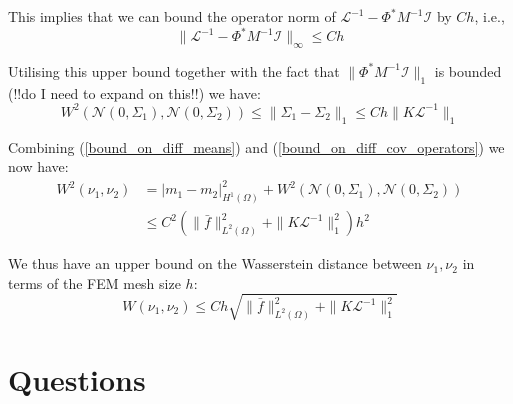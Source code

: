 \documentclass{article}
\theoremstyle{definition}
\theoremstyle{remark}
\begin{document}
This implies that we can bound the operator norm of $\mathcal{L}^{-1}-\Phi^{*}M^{-1}\mathcal{I}$ by $Ch$, i.e.,
\begin{equation}
    \label{bound_on_diff_of_solution_operators}
    \|\mathcal{L}^{-1}-\Phi^{*}M^{-1}\mathcal{I}\|_{\infty}\leq Ch
\end{equation}

Utilising this upper bound together with the fact that $\|\Phi^{*}M^{-1}\mathcal{I}\|_{1}$ is bounded (!!do I need to expand on this!!) we have:
\begin{equation}
    \label{bound_on_diff_cov_operators}
    W^{2}(\mathcal{N}(0,\Sigma_1),\mathcal{N}(0,\Sigma_2))\leq\|\Sigma_{1}-\Sigma_{2}\|_{1}\leq Ch\|K\mathcal{L}^{-1}\|_{1}
\end{equation}

Combining (\ref{bound_on_diff_means}) and (\ref{bound_on_diff_cov_operators}) we now have:
\begin{align*}
    W^{2}(\nu_{1},\nu_{2})&=|m_1-m_2|_{H^{1}(\Omega)}^{2}+W^{2}(\mathcal{N}(0,\Sigma_1),\mathcal{N}(0,\Sigma_2)) \\
    &\leq C^{2}(\|\bar{f}\|_{L^2(\Omega)}^{2}+\|K\mathcal{L}^{-1}\|_{1}^{2})h^2
\end{align*}

We thus have an upper bound on the Wasserstein distance between $\nu_{1},\nu_{2}$ in terms of the FEM mesh size $h$:
\begin{equation}
    \label{bound_on_distance}
    W(\nu_{1},\nu_{2})\leq Ch\sqrt{\|\bar{f}\|_{L^{2}(\Omega)}^{2}+\|K\mathcal{L}^{-1}\|_{1}^{2}}
\end{equation}

\section{Questions}
\end{document}

